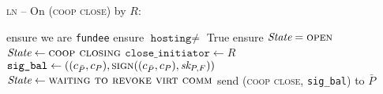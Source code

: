 \begin{center}
  \begin{processbox}{\textsc{ln} -- On (\textsc{coop close}) by $R$:}
    \begin{algorithmic}[1]
      \State ensure we are \texttt{fundee}
      \State ensure $\texttt{hosting} \neq$ True
      \State ensure $\itistate = \textsc{open}$
      \State $\itistate \gets \textsc{coop closing}$
      \State $\texttt{close\_initiator} \gets R$
      \State $\texttt{sig\_bal} \gets ((c_{\bar{P}}, c_P),
      \textsc{sign}((c_{\bar{P}}, c_P), \textit{sk}_{P, F}))$
      \State $\itistate \gets \textsc{waiting to revoke virt comm}$
      \State send (\textsc{coop close}, \texttt{sig\_bal}) to $\bar{P}$
    \end{algorithmic}
  \end{processbox}
  \label{code:ln:coop-close-fundee}
\end{center} \ \\

